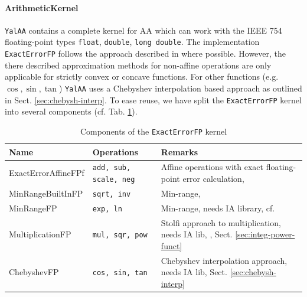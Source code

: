 \documentclass[a4]{scrartcl}
\newcommand{\yalaa}{\texttt{YalAA}\xspace}
\begin{document}
\paragraph{ArithmeticKernel}
\yalaa contains a complete kernel for AA which can work with the IEEE 754
floating-point types \texttt{float}, \texttt{double}, \texttt{long double}.
The implementation \texttt{ExactErrorFP} follows the approach described in
\cite{stolfi1997} where possible. However, the there described approximation
methods for non-affine operations are only applicable for strictly convex or
concave functions. For other functions (e.g. $\cos, \sin, \tan$) \yalaa uses a
Chebyshev interpolation based approach as outlined in
Sect. \ref{sec:chebysh-interp}. To ease reuse, we have split the
\texttt{ExactErrorFP} kernel into several components
(cf. Tab. \ref{tab:comp_arith_kernel}).
\begin{table}[h]
  \centering
  \begin{tabular}{lp{}p{}}
    \hline
    Name & Operations & Remarks\\
    \hline
    ExactErrorAffineFPf & \texttt{add, sub, scale, neg} & Affine operations with exact
    floating-point error calculation, \cite{stolfi1997}\\
    MinRangeBuiltInFP & \texttt{sqrt, inv} & Min-range, \cite{stolfi1997}\\
    MinRangeFP & \texttt{exp, ln} & Min-range, needs IA library, cf. \cite{stolfi1997}\\
    MultiplicationFP & \texttt{mul, sqr, pow} & Stolfi approach to
    multiplication, needs IA lib, \cite{stolfi1997}, Sect. \ref{sec:integ-power-funct}\\
    ChebyshevFP & \texttt{cos, sin, tan} & Chebyshev interpolation approach,
    needs IA lib, Sect. \ref{sec:chebysh-interp}\\
    \hline
  \end{tabular}
  \caption{Components of the \texttt{ExactErrorFP} kernel}
  \label{tab:comp_arith_kernel}
\end{table}
\end{document}
